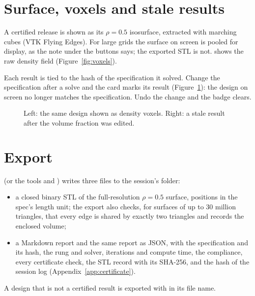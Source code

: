 \section{Surface, voxels and stale results}\label{sec:stale}
A certified release is shown as its $\rho = 0.5$ isosurface, extracted with marching cubes (VTK Flying Edges). For
large grids the surface on screen is pooled for display, as the note under the buttons says; the exported STL is not.
 shows the raw density field (Figure~\ref{fig:voxels}).

Each result is tied to the hash of the specification it solved. Change the specification after a solve and the card
marks its result  (Figure~\ref{fig:stale}): the design on screen no longer matches the specification. Undo the
change and the badge clears.

\begin{figure}[t]
\centering
\begin{minipage}[b]{0.6\linewidth}\end{minipage}\hfill
\begin{minipage}[b]{0.33\linewidth}\end{minipage}
\caption{Left: the same design shown as density voxels. Right: a stale result after the volume fraction was edited.}
\label{fig:voxels}\label{fig:stale}
\end{figure}

\section{Export}\label{sec:export}
 (or the tools  and ) writes three files to the session's
 folder:
\begin{itemize}
  \item a closed binary STL of the full-resolution $\rho = 0.5$ surface, positions in the spec's length unit; the
  export also checks, for surfaces of up to 30 million triangles, that every edge is shared by exactly two triangles and records the enclosed volume;
  \item a Markdown report and the same report as JSON, with the specification and its hash, the rung and solver,
  iterations and compute time, the compliance, every certificate check, the STL record with its SHA-256, and the hash of
  the session log (Appendix~\ref{app:certificate}).
\end{itemize}
A design that is not a certified result is exported with  in its file name.
